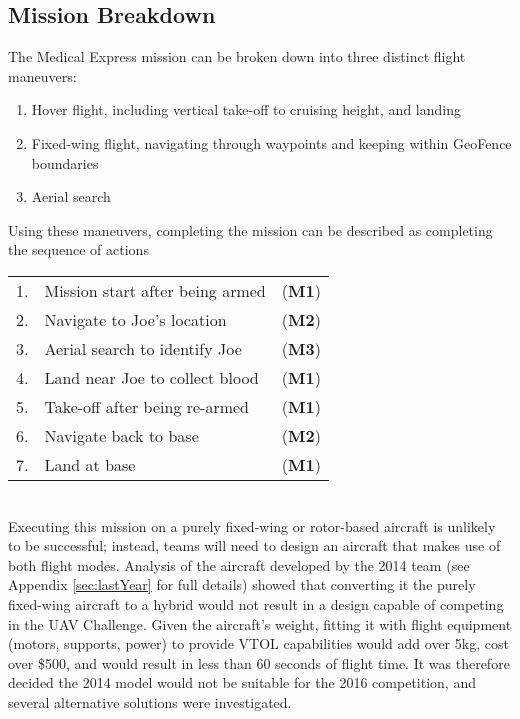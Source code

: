 \subsection{Mission Breakdown}
\label{sec:flightmaneuvers}
The Medical Express mission can be broken down into three distinct flight maneuvers:
\begin{enumerate}[label=\bfseries M\arabic*:] \itemsep-2pt
	\item Hover flight, including vertical take-off to cruising height, and landing
	\item Fixed-wing flight, navigating through waypoints and keeping within GeoFence boundaries
	\item Aerial search
\end{enumerate}

Using these maneuvers, completing the mission can be described as completing the sequence of actions\\
\begin{tabular}{r l l}
	1. & Mission start after being armed & (\textbf{M1}) \\ 
	2. & Navigate to Joe's location & (\textbf{M2}) \\ 
	3. & Aerial search to identify Joe & (\textbf{M3}) \\ 
	4. & Land near Joe to collect blood & (\textbf{M1}) \\ 
	5. & Take-off after being re-armed & (\textbf{M1}) \\ 
	6. & Navigate back to base & (\textbf{M2}) \\ 
	7. & Land at base & (\textbf{M1}) \\ 
\end{tabular}\\

Executing this mission on a purely fixed-wing or rotor-based aircraft is unlikely to be successful; instead, teams will need to design an aircraft that makes use of both flight modes. Analysis of the aircraft developed by the 2014 team (see Appendix \ref{sec:lastYear} for full details) showed that converting it the purely fixed-wing aircraft to a hybrid would not result in a design capable of competing in the UAV Challenge. Given the aircraft's weight, fitting it with flight equipment (motors, supports, power) to provide VTOL capabilities would add over 5kg, cost over \$500, and would result in less than 60 seconds of flight time. It was therefore decided the 2014 model would not be suitable for the 2016 competition, and several alternative solutions were investigated.\\

